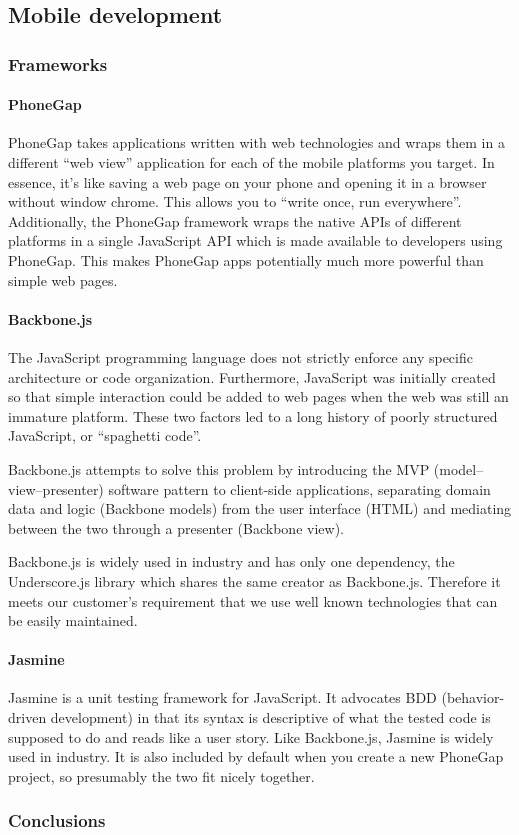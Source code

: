 \subsection{Mobile development}

\subsubsection{Frameworks}

\paragraph{PhoneGap}
PhoneGap takes applications written with web technologies and wraps them in
a different ``web view'' application for each of the mobile platforms you
target. In essence, it's like saving a web page on your phone and opening
it in a browser without window chrome. This allows you to ``write once, run
everywhere''. Additionally, the PhoneGap framework wraps the native APIs of
different platforms in a single JavaScript API which is made available to
developers using PhoneGap. This makes PhoneGap apps potentially much more
powerful than simple web pages.

\paragraph{Backbone.js}
The JavaScript programming language does not strictly enforce any specific
architecture or code organization. Furthermore, JavaScript was initially
created so that simple interaction could be added to web pages when the web was
still an immature platform. These two factors led to a long history of poorly
structured JavaScript, or ``spaghetti code''.

Backbone.js attempts to solve this problem by introducing the MVP
(model--view--presenter) software pattern to client-side applications,
separating domain data and logic (Backbone models) from the user interface
(HTML) and mediating between the two through a presenter (Backbone view).

Backbone.js is widely used in industry and has only one dependency, the
Underscore.js library which shares the same creator as Backbone.js.
Therefore it meets our customer's requirement that we use well known
technologies that can be easily maintained.

\paragraph{Jasmine}
Jasmine is a unit testing framework for JavaScript. It advocates BDD
(behavior-driven development) in that its syntax is descriptive of what the
tested code is supposed to do and reads like a user story. Like Backbone.js,
Jasmine is widely used in industry. It is also included by default when you
create a new PhoneGap project, so presumably the two fit nicely together.

\subsubsection{Conclusions}
